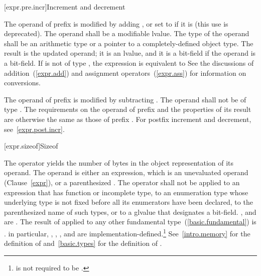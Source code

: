 [expr.pre.incr]{Increment and decrement}

\pnum
{}%
%
The operand of prefix \tcode{++}
%
%
is modified by adding ,
%
%
%
or set to  if it is  (this use is deprecated).
The operand shall be a modifiable lvalue. The type of the operand shall
be an arithmetic type or a pointer to a completely-defined object type.
The result is the updated operand; it is an lvalue, and it is a
bit-field if the operand is a bit-field. If  is not of type
, the expression  is equivalent to 
%
\enternote
See the discussions of addition~(\ref{expr.add}) and assignment
operators~(\ref{expr.ass}) for information on conversions.
\exitnote 

\pnum
The operand of prefix
%
\tcode{\dcr} is modified by subtracting . The operand shall not
be of type . The requirements on the operand of prefix
\tcode{\dcr} and the properties of its result are otherwise the same as
those of prefix \tcode{++}.
\enternote 
For postfix increment and decrement, see~\ref{expr.post.incr}.
\exitnote 

[expr.sizeof]{Sizeof}

\pnum
{}%
%
%
The  operator yields the number of bytes in the object
representation of its operand. The operand is either an expression,
which is an unevaluated operand (Clause~\ref{expr}), or a parenthesized
.
%
The  operator shall not be applied to an expression that
has function or incomplete type, to an enumeration type whose underlying type is not fixed before all
its enumerators have been declared, to the parenthesized name of such
types, or to a glvalue that designates a bit-field.
,  and
 are . The result of
 applied to any other fundamental
type~(\ref{basic.fundamental}) is .
\enternote 
in particular, , ,
, and  are
implementation-defined.\footnote{ is not required to be .}
\exitnote 
\enternote 
See~\ref{intro.memory} for the definition of 
and~\ref{basic.types} for the definition of .
\exitnote 


